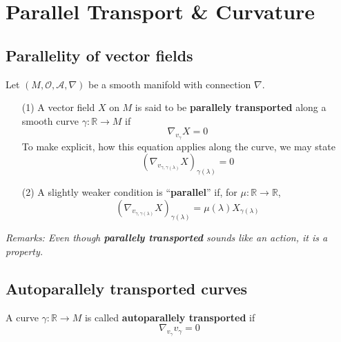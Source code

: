 \section{Parallel Transport \& Curvature}

\subsection{Parallelity of vector fields}
\begin{definition}
  Let $(M, \mathcal{O}, \mathcal{A}, \nabla)$ be a smooth manifold with connection $\nabla$.
  \begin{enumerate}
    \item[(1)] A vector field $X$ on $M$ is said to be \textbf{parallely transported} along a smooth curve $\gamma: \mathbb{R} \to M$ if 
      \begin{equation}\label{eq:parallelTransport}
        \boxed{\nabla_{v_{\gamma}} X = 0}
      \end{equation}
      To make explicit, how this equation applies along the curve, we may state
      \begin{equation*}
        \left(\nabla_{v_{\gamma, \gamma(\lambda)}} X\right)_{\gamma(\lambda)} = 0
      \end{equation*}
    \item[(2)] A slightly weaker condition is ``\textbf{parallel}'' if, for $\mu : \mathbb{R} \to \mathbb{R}$,
      \begin{equation}
        \boxed{\left(\nabla_{v_{\gamma, \gamma(\lambda)}} X\right)_{\gamma(\lambda)} = \mu(\lambda) X_{\gamma(\lambda)}}
      \end{equation}
  \end{enumerate}
\end{definition}

\textit{Remarks: Even though \textbf{parallely transported} sounds like an action, it is a property.}

\subsection{Autoparallely transported curves}
\begin{definition}
  A curve $\gamma: \mathbb{R} \to M$ is called \textbf{autoparallely transported} if 
  \begin{equation}
    \boxed{\nabla_{v_{\gamma}}v_{\gamma} = 0}
  \end{equation}
\end{definition}


